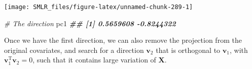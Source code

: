 \documentclass[
]{book}
\newenvironment{Shaded}{\begin{snugshade}}{\end{snugshade}}
\newcommand{\AttributeTok}[1]{\textcolor[rgb]{0.13,0.29,0.53}{#1}}
\newcommand{\CommentTok}[1]{\textcolor[rgb]{0.56,0.35,0.01}{\textit{#1}}}
\newcommand{\DecValTok}[1]{\textcolor[rgb]{0.00,0.00,0.81}{#1}}
\newcommand{\DocumentationTok}[1]{\textcolor[rgb]{0.56,0.35,0.01}{\textbf{\textit{#1}}}}
\newcommand{\FloatTok}[1]{\textcolor[rgb]{0.00,0.00,0.81}{#1}}
\newcommand{\FunctionTok}[1]{\textcolor[rgb]{0.13,0.29,0.53}{\textbf{#1}}}
\newcommand{\NormalTok}[1]{#1}
\newcommand{\OtherTok}[1]{\textcolor[rgb]{0.56,0.35,0.01}{#1}}
\newcommand{\SpecialCharTok}[1]{\textcolor[rgb]{0.81,0.36,0.00}{\textbf{#1}}}
\newcommand{\StringTok}[1]{\textcolor[rgb]{0.31,0.60,0.02}{#1}}
\theoremstyle{definition}
\theoremstyle{definition}
\theoremstyle{definition}
\theoremstyle{definition}
\theoremstyle{remark}
\begin{document}
\begin{Shaded}
\end{Shaded}

\begin{center}\texttt{[image: SMLR\_files/figure-latex/unnamed-chunk-289-1]} \end{center}

\begin{Shaded}
\begin{Highlighting}[]
  
  \CommentTok{\# The direction }
\NormalTok{  pc1}
\DocumentationTok{\#\# [1]  0.5659608 {-}0.8244322}
\end{Highlighting}
\end{Shaded}

Once we have the first direction, we can also remove the projection from the original covariates, and search for a direction \(\mathbf{v}_2\) that is orthogonal to \(\mathbf{v}_1\), with \(\mathbf{v}_1^\text{T}\mathbf{v}_2 = 0\), such that it contains large variation of \(\mathbf{X}\).
\end{document}
